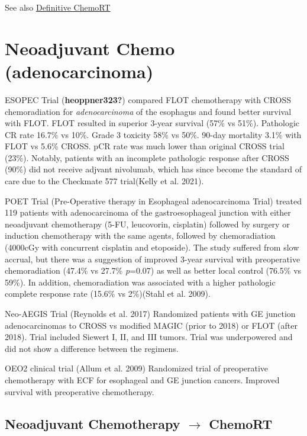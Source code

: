 \documentclass[
  letterpaper,
]{scrbook}
\begin{document}
See also \hyperref[eso_dcrt]{Definitive ChemoRT}

\section{Neoadjuvant Chemo
(adenocarcinoma)}\label{neoadjuvant-chemo-adenocarcinoma}

ESOPEC Trial (\textbf{heoppner323?}) compared FLOT chemotherapy with
CROSS chemoradiation for \emph{adenocarcinoma} of the esophagus and
found better survival with FLOT. FLOT resulted in superior 3-year
survival (57\% vs 51\%). Pathologic CR rate 16.7\% vs 10\%. Grade 3
toxicity 58\% vs 50\%. 90-day mortality 3.1\% with FLOT vs 5.6\% CROSS.
pCR rate was much lower than original CROSS trial (23\%). Notably,
patients with an incomplete pathologic response after CROSS (90\%) did
not receive adjvant nivolumab, which has since become the standard of
care due to the Checkmate 577 trial(Kelly et al. 2021).

POET Trial (Pre-Operative therapy in Esophageal adenocarcinoma Trial)
treated 119 patients with adenocarcinoma of the gastroesophageal
junction with either neoadjuvant chemotherapy (5-FU, leucovorin,
cisplatin) followed by surgery or induction chemotherapy with the same
agents, followed by chemoradiation (4000cGy with concurrent cisplatin
and etoposide). The study suffered from slow accrual, but there was a
suggestion of improved 3-year survival with preoperative chemoradiation
(47.4\% vs 27.7\% \emph{p}=0.07) as well as better local control (76.5\%
vs 59\%). In addition, chemoradiation was associated with a higher
pathologic complete response rate (15.6\% vs 2\%)(Stahl et al. 2009).

Neo-AEGIS Trial (Reynolds et al. 2017) Randomized patients with GE
junction adenocarcinomas to CROSS vs modified MAGIC (prior to 2018) or
FLOT (after 2018). Trial included Siewert I, II, and III tumors. Trial
was underpowered and did not show a difference between the regimens.

OEO2 clinical trial (Allum et al. 2009) Randomized trial of preoperative
chemotherapy with ECF for esophageal and GE junction cancers. Improved
survival with preoperative chemotherapy.

\subsection{\texorpdfstring{Neoadjuvant Chemotherapy \(\rightarrow\)
ChemoRT}{Neoadjuvant Chemotherapy \textbackslash rightarrow ChemoRT}}\label{neoadjuvant-chemotherapy-rightarrow-chemort}
\end{document}
